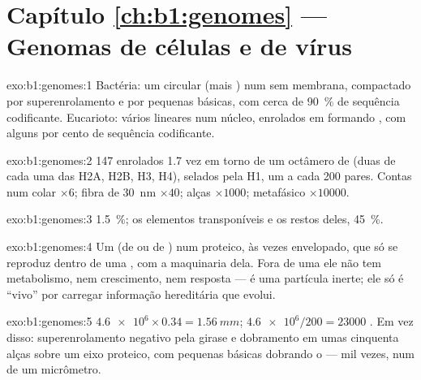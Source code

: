\section*{Capítulo \ref{ch:b1:genomes} --- Genomas de células e de vírus}

\begin{solution}{exo:b1:genomes:1}
Bactéria: um  circular (mais ) num  sem
membrana, compactado por superenrolamento e por pequenas 
básicas, com cerca de \qty{90}{\%} de sequência codificante. Eucarioto:
vários  lineares num núcleo, enrolados em  formando
, com alguns por cento de sequência codificante.
\end{solution}

\begin{solution}{exo:b1:genomes:2}
147  enrolados 1.7 vez em torno de um octâmero de 
(duas de cada uma das H2A, H2B, H3, H4), selados pela H1, um a cada 200
pares. Contas num colar $\times 6$; fibra de \qty{30}{nm} $\times 40$;
alças $\times 1000$;  metafásico $\times \num{10000}$.
\end{solution}

\begin{solution}{exo:b1:genomes:3}
\qty{1.5}{\%}; os elementos transponíveis e os restos deles, \qty{45}{\%}.
\end{solution}

\begin{solution}{exo:b1:genomes:4}
Um  (de  ou de ) num  proteico, às vezes envelopado,
que só se reproduz dentro de uma , com a maquinaria dela. Fora de
uma  ele não tem metabolismo, nem crescimento, nem resposta --- é
uma partícula inerte; ele só é ``vivo'' por carregar informação
hereditária que evolui.
\end{solution}

\begin{solution}{exo:b1:genomes:5}
$\num{4.6e6}\times 0.34 = \qty{1.56}{mm}$; $\num{4.6e6}/200 = \num{23000}$
. Em vez disso: superenrolamento negativo pela girase e
dobramento em umas cinquenta alças sobre um eixo proteico, com pequenas
 básicas dobrando o  --- mil vezes, num  de um
micrômetro.
\end{solution}

